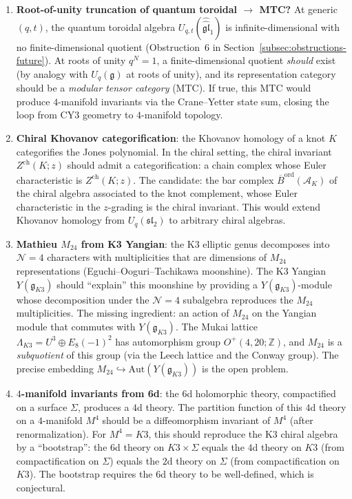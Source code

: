 \documentclass[11pt]{article}
\newcommand{\cA}{\mathcal{A}}
\newcommand{\cN}{\mathcal{N}}
\newcommand{\fg}{\mathfrak{g}}
\newcommand{\fgl}{\mathfrak{gl}}
\newcommand{\barB}{\overline{B}}
\newcommand{\Z}{\mathbb{Z}}
\begin{document}
\begin{enumerate}[label=\textup{(\arabic*)}]
 \item \textbf{Root-of-unity truncation of quantum toroidal $\to$ MTC?}
 At generic $(q, t)$, the quantum toroidal algebra
 $U_{q,t}(\widehat{\widehat{\fgl}}_1)$ is infinite-dimensional with
 no finite-dimensional quotient (Obstruction~6 in
 Section~\ref{subsec:obstructions-future}). At roots of unity
 $q^N = 1$, a finite-dimensional quotient \emph{should} exist
 (by analogy with $U_q(\fg)$ at roots of unity), and its
 representation category should be a \emph{modular tensor category}
 (MTC). If true, this MTC would produce $4$-manifold invariants
 via the Crane--Yetter state sum, closing the loop from CY3 geometry
 to $4$-manifold topology.

 \item \textbf{Chiral Khovanov categorification}: the Khovanov
 homology of a knot $K$ categorifies the Jones polynomial. In the
 chiral setting, the chiral invariant $Z^{\mathrm{ch}}(K; z)$ should
 admit a categorification: a chain complex whose Euler characteristic
 is $Z^{\mathrm{ch}}(K; z)$. The candidate: the bar complex
 $\barB^{\mathrm{ord}}(\cA_K)$ of the chiral algebra associated to
 the knot complement, whose Euler characteristic in the $z$-grading
 is the chiral invariant. This would extend Khovanov homology from
 $U_q(\mathfrak{sl}_2)$ to arbitrary chiral algebras.

 \item \textbf{Mathieu $M_{24}$ from K3 Yangian}: the K3 elliptic
 genus decomposes into $\cN = 4$ characters with multiplicities that
 are dimensions of $M_{24}$ representations (Eguchi--Ooguri--Tachikawa
 moonshine). The K3 Yangian $Y(\fg_{K3})$ should ``explain'' this
 moonshine by providing a $Y(\fg_{K3})$-module whose decomposition
 under the $\cN = 4$ subalgebra reproduces the $M_{24}$ multiplicities.
 The missing ingredient: an action of $M_{24}$ on the Yangian module
 that commutes with $Y(\fg_{K3})$. The Mukai lattice
 $\Lambda_{K3} = U^3 \oplus E_8(-1)^2$ has automorphism group
 $O^+(4, 20; \Z)$, and $M_{24}$ is a \emph{subquotient} of this
 group (via the Leech lattice and the Conway group). The precise
 embedding $M_{24} \hookrightarrow \mathrm{Aut}(Y(\fg_{K3}))$ is
 the open problem.

 \item \textbf{$4$-manifold invariants from 6d}: the $6$d
 holomorphic theory, compactified on a surface $\Sigma$, produces
 a $4$d theory. The partition function of this $4$d theory on a
 $4$-manifold $M^4$ should be a diffeomorphism invariant of $M^4$
 (after renormalization). For $M^4 = K3$, this should reproduce the
 K3 chiral algebra by a ``bootstrap'': the $6$d theory on $K3 \times \Sigma$
 equals the $4$d theory on $K3$ (from compactification on $\Sigma$)
 equals the $2$d theory on $\Sigma$ (from compactification on $K3$).
 The bootstrap requires the $6$d theory to be well-defined, which
 is conjectural.


\end{enumerate}
\end{document}
